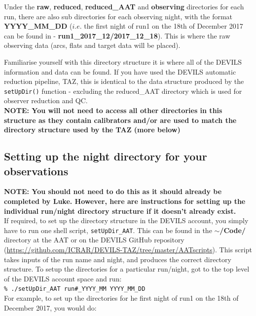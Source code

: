 \documentclass[12pt]{article}
\begin{document}
Under the \textbf{raw}, \textbf{reduced}, \textbf{reduced\_AAT} and \textbf{observing} directories for each run, there are also sub directories for each observing night, with the format \textbf{YYYY\_MM\_DD} ($i.e.$ the first night of run1 on the 18th of December 2017 can be found in - \textbf{run1\_2017\_12/2017\_12\_18}). This is where the raw observing data (arcs, flats and target data will be placed).

Familiarise yourself with this directory structure it is where all of the DEVILS information and data can be found. If you have used the DEVILS automatic reduction pipeline, TAZ, this is identical to the data structure produced by the \texttt{setUpDir()} function - excluding the reduced\_AAT directory which is used for observer reduction and QC. \\

\textcolor{PineGreen}{\textbf{NOTE: You will not need to access all other directories in this structure as they contain calibrators and/or are used to match the directory structure used by the TAZ (more below)}}\\


\subsection{Setting up the night directory for your observations}

\textcolor{PineGreen}{\textbf{NOTE: You should not need to do this as it should already be completed by Luke. However, here are instructions for setting up the individual run/night directory structure if it doesn't already exist.}} \\

If required, to set up the directory structure in the DEVILS account, you simply have to run one shell script, \texttt{setUpDir\_AAT}. This can be found in the \textbf{$\sim$/Code/} directory at the AAT or on the DEVILS GitHub repository (\url{https://github.com/ICRAR/DEVILS-TAZ/tree/master/AATscripts}). This script  takes inputs of the run name and night, and produces the correct directory structure. To setup the directories for a particular run/night, got to the top level of the DEVILS account space and run:\\

\hspace{10mm} \texttt{\% ./setUpDir\_AAT run\#\_YYYY\_MM YYYY\_MM\_DD} \\

For example, to set up the directories for he first night of run1 on the 18th of December 2017, you would do: \\
\end{document}
